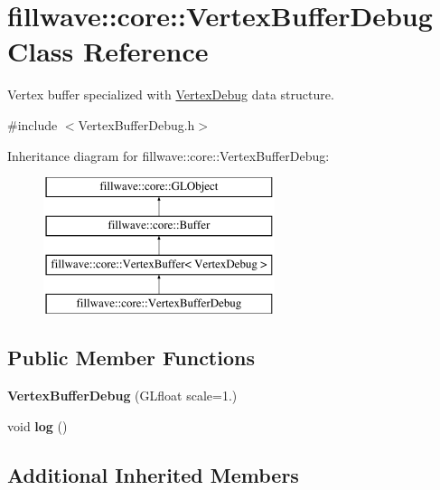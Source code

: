 \hypertarget{classfillwave_1_1core_1_1VertexBufferDebug}{}\section{fillwave\+:\+:core\+:\+:Vertex\+Buffer\+Debug Class Reference}
\label{classfillwave_1_1core_1_1VertexBufferDebug}


Vertex buffer specialized with \hyperlink{structfillwave_1_1core_1_1VertexDebug}{Vertex\+Debug} data structure.  




{\ttfamily \#include $<$Vertex\+Buffer\+Debug.\+h$>$}

Inheritance diagram for fillwave\+:\+:core\+:\+:Vertex\+Buffer\+Debug\+:\begin{figure}[H]
\begin{center}
\leavevmode
\includegraphics[height=4.000000cm]{classfillwave_1_1core_1_1VertexBufferDebug}
\end{center}
\end{figure}
\subsection*{Public Member Functions}
\begin{DoxyCompactItemize}
\item 
\hypertarget{classfillwave_1_1core_1_1VertexBufferDebug_aec74b6fbb334da1404824019d83bc8e8}{}{\bfseries Vertex\+Buffer\+Debug} (G\+Lfloat scale=1.)\label{classfillwave_1_1core_1_1VertexBufferDebug_aec74b6fbb334da1404824019d83bc8e8}

\item 
\hypertarget{classfillwave_1_1core_1_1VertexBufferDebug_ad6393acc4459a8176871b0b9ae3b0800}{}void {\bfseries log} ()\label{classfillwave_1_1core_1_1VertexBufferDebug_ad6393acc4459a8176871b0b9ae3b0800}

\end{DoxyCompactItemize}
\subsection*{Additional Inherited Members}


